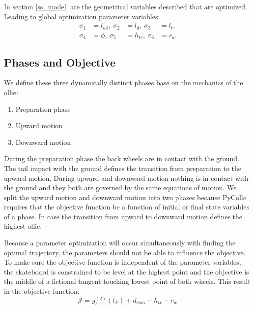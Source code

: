 \documentclass[default,iicol]{sn-jnl}
\begin{document}
In section \ref{ss_model} are the geometrical variables described that are
optimized. Leading to global optimization parameter variables:
\begin{equation}
\begin{array}{rlrl}
    \sigma_{1} &= l_{wb},\ \sigma_{2} &= l_d,\ \sigma_{3} &= l_t,   \\ 
    \sigma_{4} &= \phi,\ \sigma_{5} &= h_{tr},\  \sigma_{6} &= r_w 
\end{array}
\end{equation}

\subsection{Phases and Objective} \label{s_phases}
We define these three dynamically distinct phases base on the mechanics of the
ollie:
\begin{enumerate} \label{n_phases}
  \item Preparation phase
  \item Upward motion
  \item Downward motion
\end{enumerate}
During the preparation phase the back wheels are in contact with the
ground.
The tail impact with the ground defines the transition from preparation to the
upward motion.
During upward and downward motion nothing is in contact with the ground and
they both are governed by the same equations of motion.
We split the upward motion and downward motion into two phases because PyCollo
requires that the objective function be a function of initial or final state
variables \cite{brockie_predictive_2021} of a phase. In case the transition
from upward to downward motion defines the highest ollie.

Because a parameter optimization will occur simultaneously with finding the
optimal trajectory, the parameters should not be able to influence the
objective.
To make sure the objective function is independent of the parameter
variables, the skateboard is constrained to be level at the highest point and
the objective is the middle of a fictional tangent touching lowest point of
both wheels.
This result in the objective function:
%
\begin{equation}
  \mathcal{J} = y_s^{(2)}(t_F) + d_{com} - h_{tr} - r_w
\end{equation}
\end{document}
